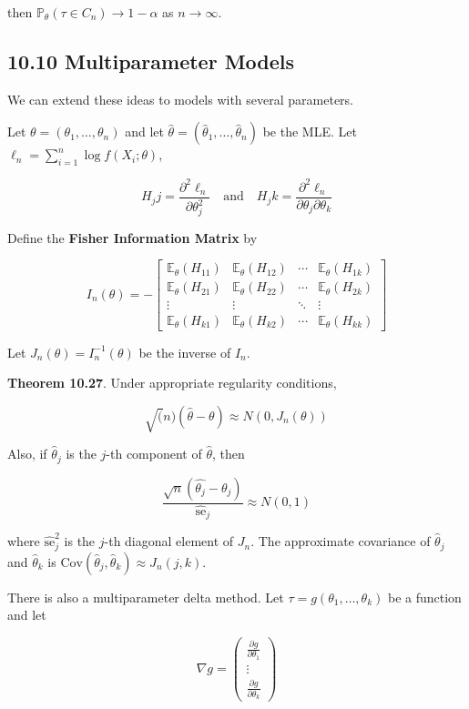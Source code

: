 then \(\mathbb{P}_\theta(\tau \in C_n) \rightarrow 1 - \alpha\) as
\(n \rightarrow \infty\).

\subsection{10.10 Multiparameter Models}\label{multiparameter-models}

We can extend these ideas to models with several parameters.

Let \(\theta = (\theta_1, \dots, \theta_n)\) and let
\(\hat{\theta} = (\hat{\theta}_1, \dots, \hat{\theta}_n)\) be the MLE.
Let \(\ell_n = \sum_{i=1}^n \log f(X_i; \theta)\),

\[
H_jj = \frac{\partial^2 \ell_n}{\partial \theta_j^2}
\quad \text{and} \quad
H_jk = \frac{\partial^2 \ell_n}{\partial \theta_j \partial \theta_k}
\]

Define the \textbf{Fisher Information Matrix} by

\[
I_n(\theta) = -
\begin{bmatrix}
\mathbb{E}_\theta(H_{11}) & \mathbb{E}_\theta(H_{12}) & \cdots & \mathbb{E}_\theta(H_{1k}) \\
\mathbb{E}_\theta(H_{21}) & \mathbb{E}_\theta(H_{22}) & \cdots & \mathbb{E}_\theta(H_{2k}) \\
\vdots & \vdots & \ddots & \vdots \\
\mathbb{E}_\theta(H_{k1}) & \mathbb{E}_\theta(H_{k2}) & \cdots & \mathbb{E}_\theta(H_{kk})
\end{bmatrix}
\]

Let \(J_n(\theta) = I_n^{-1}(\theta)\) be the inverse of \(I_n\).

\textbf{Theorem 10.27}. Under appropriate regularity conditions,

\[ \sqrt(n)(\hat{\theta} - \theta) \approx N(0, J_n(\theta))\]

Also, if \(\hat{\theta}_j\) is the \(j\)-th component of
\(\hat{\theta}\), then

\[ \frac{\sqrt{n}(\hat{\theta_j} - \theta_j)}{\hat{\text{se}}_j} \approx N(0, 1) \]

where \(\hat{\text{se}}_j^2\) is the \(j\)-th diagonal element of
\(J_n\). The approximate covariance of \(\hat{\theta}_j\) and
\(\hat{\theta}_k\) is
\(\text{Cov}(\hat{\theta}_j, \hat{\theta}_k) \approx J_n(j, k)\).

There is also a multiparameter delta method. Let
\(\tau = g(\theta_1, \dots, \theta_k)\) be a function and let

\[ \nabla g = \begin{pmatrix}
\frac{\partial g}{\partial \theta_1} \\
\vdots \\
\frac{\partial g}{\partial \theta_k}
\end{pmatrix}
\]

